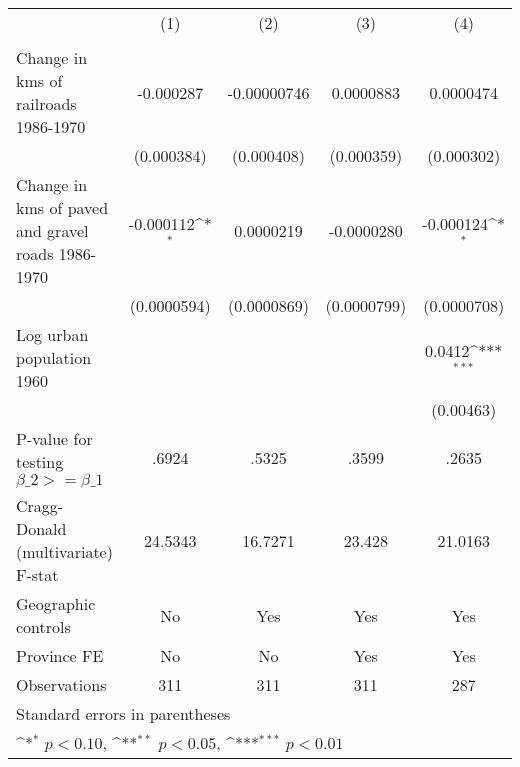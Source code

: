 {
\def\sym#1{\ifmmode^{#1}\else\(^{#1}\)\fi}
\begin{tabular}{l*{4}{c}}
\hline\hline
                &\multicolumn{1}{c}{(1)}&\multicolumn{1}{c}{(2)}&\multicolumn{1}{c}{(3)}&\multicolumn{1}{c}{(4)}\\
                &\multicolumn{1}{c}{}&\multicolumn{1}{c}{}&\multicolumn{1}{c}{}&\multicolumn{1}{c}{}\\
\hline
Change in kms of railroads 1986-1970&-0.000287         &-0.00000746         &0.0000883         &0.0000474         \\
                &(0.000384)         &(0.000408)         &(0.000359)         &(0.000302)         \\
[1em]
Change in kms of paved and gravel roads 1986-1970&-0.000112\sym{*}  &0.0000219         &-0.0000280         &-0.000124\sym{*}  \\
                &(0.0000594)         &(0.0000869)         &(0.0000799)         &(0.0000708)         \\
[1em]
Log urban population 1960&                  &                  &                  &   0.0412\sym{***}\\
                &                  &                  &                  &(0.00463)         \\
\hline
P-value for testing $\beta\_{2} >= \beta\_{1}$&    .6924         &    .5325         &    .3599         &    .2635         \\
Cragg-Donald (multivariate) F-stat&  24.5343         &  16.7271         &   23.428         &  21.0163         \\
Geographic controls&       No         &      Yes         &      Yes         &      Yes         \\
Province FE     &       No         &       No         &      Yes         &      Yes         \\
Observations    &      311         &      311         &      311         &      287         \\
\hline\hline
\multicolumn{5}{l}{\footnotesize Standard errors in parentheses}\\
\multicolumn{5}{l}{\footnotesize \sym{*} \(p<0.10\), \sym{**} \(p<0.05\), \sym{***} \(p<0.01\)}\\
\end{tabular}
}
